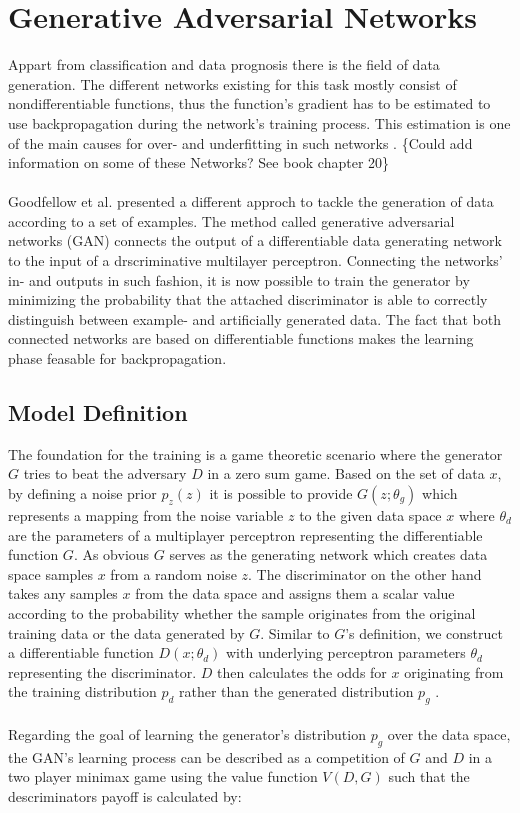 \section{Generative Adversarial Networks}

Appart from classification and data prognosis there is the field of data generation.
The different networks existing for this task mostly consist of nondifferentiable functions, thus the function's gradient has to be estimated to use backpropagation during the network's training process.
This estimation is one of the main causes for over- and underfitting in such networks \cite{1}.
\{Could add information on some of these Networks? See book chapter 20\}
\\
\\
Goodfellow et al. \cite{1} presented a different approch to tackle the generation of data according to a set of examples.
The method called generative adversarial networks (GAN) connects the output of a differentiable data generating network to the input of a drscriminative multilayer perceptron.
Connecting the networks' in- and outputs in such fashion, it is now possible to train the generator by minimizing the probability that the attached discriminator is able to correctly distinguish between example- and artificially generated data.
The fact that both connected networks are based on differentiable functions makes the learning phase feasable for backpropagation.


  \subsection{Model Definition}

  The foundation for the training is a game theoretic scenario where the generator \(  G  \) tries to beat the adversary \(  D  \) in a zero sum game.
  Based on the set of data \(  x  \), by defining a noise prior \(  p_z(z)  \) it is possible to provide \(  G(z; \theta_g)  \) which represents a mapping from the noise variable \(  z  \) to the given data space \( x \) where \( \theta_d \) are the parameters of a multiplayer perceptron representing the differentiable function \( G \).
  As obvious \( G \) serves as the generating network which creates data space samples \( x \) from a random noise \( z \).
  The discriminator on the other hand takes any samples \( x \) from the data space and assigns them a scalar value according to the probability whether the sample originates from the original training data or the data generated by \( G \).
  Similar to \( G \)'s definition, we construct a differentiable function \( D(x; \theta_d) \) with underlying perceptron parameters \( \theta_d \) representing the discriminator.
  \( D \) then calculates the odds for \( x \) originating from the training distribution \( p_d \) rather than the generated distribution \( p_g \) \cite{1,2}.
  \\
  \\
  Regarding the goal of learning the generator's distribution \( p_g \) over the data space, the GAN's learning process can be described as a competition of \( G \) and \( D \) in a two player minimax game using the value function \( V(D,G) \) such that the descriminators payoff is calculated by:

